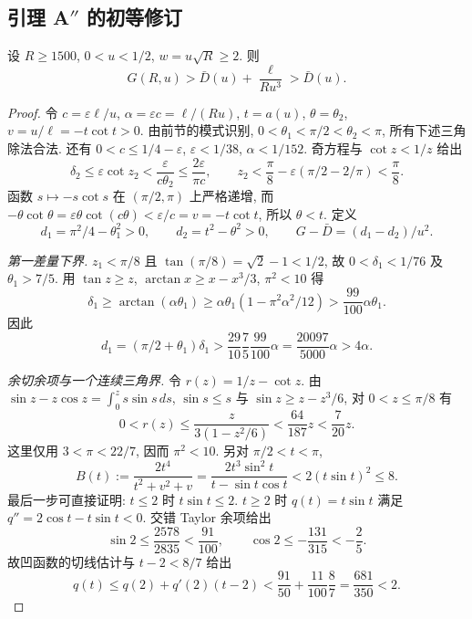 \subsection{引理 A\texorpdfstring{$''$}{} 的初等修订}\label{sec:lemAdp}
\begin{theorem}[引理 A$''$, 带正余量]\label{thm:lemAdp}
设 $R\ge1500$, $0<u<1/2$, $w=u\sqrt R\ge2$. 则
\begin{equation}
 G(R,u)>\bar D(u)+\frac{\ell}{Ru^3}>\bar D(u).
\end{equation}
\end{theorem}
\begin{proof}
令 $c=\varepsilon\ell/u$, $\alpha=\varepsilon c=\ell/(Ru)$,
$t=a(u)$, $\theta=\theta_2$, $v=u/\ell=-t\cot t>0$.
由前节的模式识别, $0<\theta_1<\pi/2<\theta_2<\pi$, 所有下述三角除法合法.
还有 $0<c\le1/4-\varepsilon$, $\varepsilon<1/38$, $\alpha<1/152$.
奇方程与 $\cot z<1/z$ 给出
\[
 \delta_2\le\varepsilon\cot z_2<\frac{\varepsilon}{c\theta_2}
 \le\frac{2\varepsilon}{\pi c},\qquad
 z_2<\frac\pi8-\varepsilon(\pi/2-2/\pi)<\frac\pi8.
\]
函数 $s\mapsto-s\cot s$ 在 $(\pi/2,\pi)$ 上严格递增, 而
$-\theta\cot\theta=\varepsilon\theta\cot(c\theta)<\varepsilon/c=v=-t\cot t$,
所以 $\theta<t$. 定义
\[
 d_1=\pi^2/4-\theta_1^2>0,\qquad d_2=t^2-\theta^2>0,\qquad
 G-\bar D=(d_1-d_2)/u^2.
\]

\emph{第一差量下界.} $z_1<\pi/8$ 且 $\tan(\pi/8)=\sqrt2-1<1/2$,
故 $0<\delta_1<1/76$ 及 $\theta_1>7/5$.
用 $\tan z\ge z$, $\arctan x\ge x-x^3/3$, $\pi^2<10$ 得
\[
 \delta_1\ge\arctan(\alpha\theta_1)
 \ge\alpha\theta_1(1-\pi^2\alpha^2/12)
 >\frac{99}{100}\alpha\theta_1.
\]
因此
\begin{equation}
 d_1=(\pi/2+\theta_1)\delta_1
 >\frac{29}{10}\frac75\frac{99}{100}\alpha
 =\frac{20097}{5000}\alpha>4\alpha.\label{eq:r8-def1}
\end{equation}

\emph{余切余项与一个连续三角界.} 令 $r(z)=1/z-\cot z$.
由 $\sin z-z\cos z=\int_0^z s\sin s\,ds$,
$\sin s\le s$ 与 $\sin z\ge z-z^3/6$, 对 $0<z\le\pi/8$ 有
\begin{equation}
 0<r(z)\le\frac{z}{3(1-z^2/6)}
 <\frac{64}{187}z<\frac7{20}z.\label{eq:r8-cot-elementary}
\end{equation}
这里仅用 $3<\pi<22/7$, 因而 $\pi^2<10$.
另对 $\pi/2<t<\pi$,
\begin{equation}
 B(t):=\frac{2t^4}{t^2+v^2+v}
 =\frac{2t^3\sin^2t}{t-\sin t\cos t}<2(t\sin t)^2\le8.\label{eq:r8-B8}
\end{equation}
最后一步可直接证明: $t\le2$ 时 $t\sin t\le2$.
$t\ge2$ 时 $q(t)=t\sin t$ 满足 $q''=2\cos t-t\sin t<0$.
交错 Taylor 余项给出
\[
 \sin2\le\frac{2578}{2835}<\frac{91}{100},\qquad
 \cos2\le-\frac{131}{315}<-\frac25.
\]
故凹函数的切线估计与 $t-2<8/7$ 给出
\[
 q(t)\le q(2)+q'(2)(t-2)
 <\frac{91}{50}+\frac{11}{100}\frac87
 =\frac{681}{350}<2.
\]


\end{proof}
